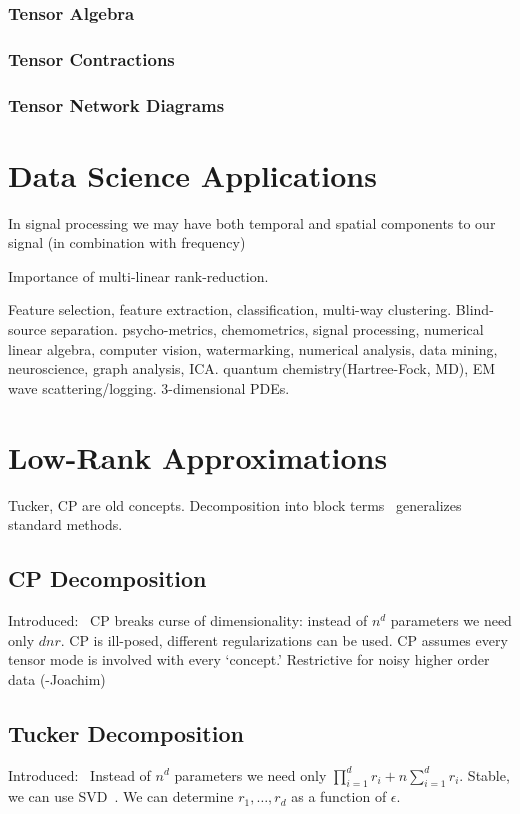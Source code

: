 \documentclass[10pt]{article}
\begin{document}
\subsubsection{Tensor Algebra}
\subsubsection{Tensor Contractions}
\subsubsection{Tensor Network Diagrams}

\section{Data Science Applications}
In signal processing we may have both temporal and spatial components to our signal (in combination with frequency)

Importance of multi-linear rank-reduction.

Feature selection, feature extraction, classification, multi-way clustering.
Blind-source separation. 
psycho-metrics, chemometrics, signal processing, numerical linear algebra, computer vision, watermarking, numerical analysis, data mining, neuroscience, graph analysis, ICA.
quantum chemistry(Hartree-Fock, MD), EM wave scattering/logging. 3-dimensional PDEs. 
\section{Low-Rank Approximations}

Tucker, CP are old concepts. Decomposition into block terms~\cite{Lathauwer08decompositionsof} generalizes standard methods.

\subsection{CP Decomposition}
Introduced:~\cite{hitchcock-sum-1927}
CP breaks curse of dimensionality: instead of $n^d$ parameters we need only $dnr$.
CP is ill-posed, different regularizations can be used.
CP assumes every tensor mode is involved with every `concept.' Restrictive for noisy higher order data (-Joachim)
\subsection{Tucker Decomposition}
Introduced:~\cite{Tuck1966c}
Instead of $n^d$ parameters we need only $\prod_{i=1}^d r_i + n\sum_{i=1}^d r_i$.
Stable, we can use SVD~\cite{Lathauwer00amultilinear}.
We can determine $r_1, \dots, r_d$ as a function of $\epsilon$.
\end{document}
